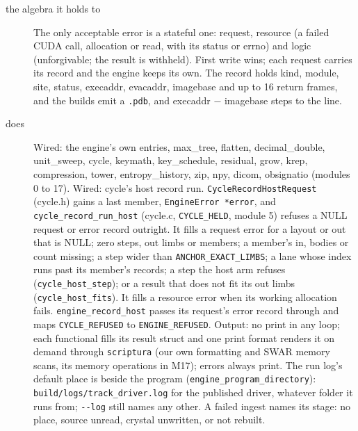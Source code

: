 \begin{description}
\item[{the algebra it holds to}] The only acceptable error is a stateful one: request, resource (a failed CUDA call, allocation or read, with its status or errno) and logic (unforgivable; the result is withheld). First write wins; each request carries its record and the engine keeps its own. The record holds kind, module, site, status, execaddr, evacaddr, imagebase and up to 16 return frames, and the builds emit a \texttt{.\allowbreak{}pdb}, and execaddr − imagebase steps to the line.
\item[{does}] Wired: the engine's own entries, max\_\allowbreak{}tree, flatten, decimal\_\allowbreak{}double, unit\_\allowbreak{}sweep, cycle, keymath, key\_\allowbreak{}schedule, residual, grow, krep, compression, tower, entropy\_\allowbreak{}history, zip, npy, dicom, obsignatio (modules 0 to 17). Wired: cycle's host record run. \texttt{Cycle\allowbreak{}Record\allowbreak{}Host\allowbreak{}Request} (cycle.h) gains a last member, \texttt{Engine\allowbreak{}Error *error}, and \texttt{cycle\_\allowbreak{}record\_\allowbreak{}run\_\allowbreak{}host} (cycle.c, \texttt{CYCLE\_\allowbreak{}HELD}, module 5) refuses a NULL request or error record outright. It fills a request error for a layout or out that is NULL; zero steps, out limbs or members; a member's in, bodies or count missing; a step wider than \texttt{ANCHOR\_\allowbreak{}EXACT\_\allowbreak{}LIMBS}; a lane whose index runs past its member's records; a step the host arm refuses (\texttt{cycle\_\allowbreak{}host\_\allowbreak{}step}); or a result that does not fit its out limbs (\texttt{cycle\_\allowbreak{}host\_\allowbreak{}fits}). It fills a resource error when its working allocation fails. \texttt{engine\_\allowbreak{}record\_\allowbreak{}host} passes its request's error record through and maps \texttt{CYCLE\_\allowbreak{}REFUSED} to \texttt{ENGINE\_\allowbreak{}REFUSED}. Output: no print in any loop; each functional fills its result struct and one print format renders it on demand through \texttt{scriptura} (our own formatting and SWAR memory scans, its memory operations in M17); errors always print. The run log's default place is beside the program (\texttt{engine\_\allowbreak{}program\_\allowbreak{}directory}): \texttt{build/\allowbreak{}logs/\allowbreak{}track\_\allowbreak{}driver.\allowbreak{}log} for the published driver, whatever folder it runs from; \texttt{-\allowbreak{}-\allowbreak{}log} still names any other. A failed ingest names its stage: no place, source unread, crystal unwritten, or not rebuilt.

\end{description}
